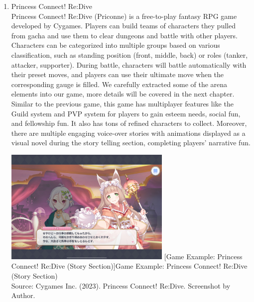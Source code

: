 \documentclass[12pt,oneside,openright,a4paper]{cpe-english-project}
\begin{document}
\begin{enumerate}
	\item Princess Connect! Re:Dive \\
	Princess Connect! Re:Dive (Priconne) is a free-to-play fantasy RPG game developed by Cygames. Players can build teams of characters they pulled from gacha and use them to clear dungeons and battle with other players. Characters can be categorized into multiple groups based on various classification, such as standing position (front, middle, back) or roles (tanker, attacker, supporter). During battle, characters will battle automatically with their preset moves, and players can use their ultimate move when the corresponding gauge is filled. We carefully extracted some of the arena elements into our game, more details will be covered in the next chapter. \\
	Similar to the previous game, this game has multiplayer features like the Guild system and PVP system for players to gain esteem needs, social fun, and fellowship fun. It also has tons of refined characters to collect. Moreover, there are multiple engaging voice-over stories with animations displayed as a visual novel during the story telling section, completing players' narrative fun. \\

    	\captionsetup{justification=centering}	
	\begin{minipage}[c]{\textwidth}\centering
	\includegraphics[width=8cm]{figure/related-work-princon-story.png}
	[Game Example: Princess Connect! Re:Dive (Story Section)]{Game Example: Princess Connect! Re:Dive (Story Section)
		\\ Source: Cygames Inc. (2023). Princess Connect! Re:Dive. Screenshot by Author.}
	\label{fig:related-work-princon-story}
	\end{minipage}
	

\end{enumerate}
\end{document}
